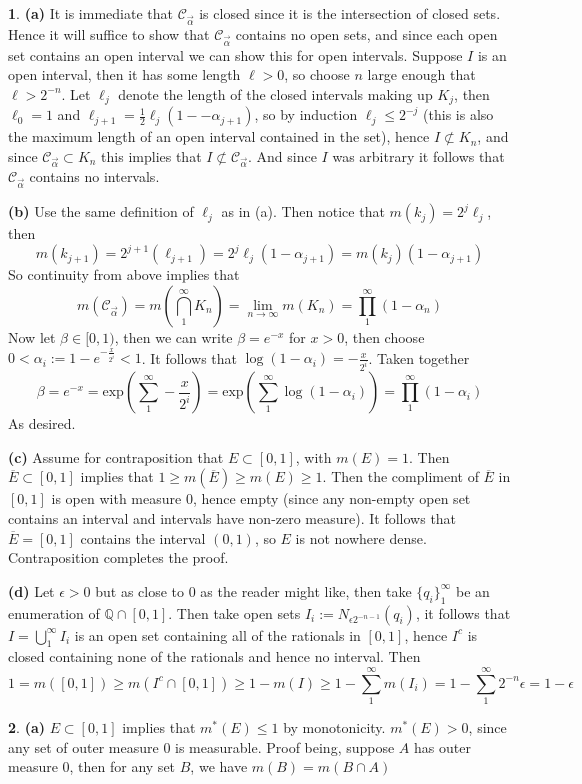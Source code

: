 \documentclass[10.5pt]{article}
\theoremstyle{definition}
\newtheorem{pb}{}
\newcommand{\set}[1]{\{#1\}}
\begin{document}
    \begin{pb}
        \textbf{(a)} It is immediate that \(\mathcal{C}_{\overrightarrow{\alpha}}\) is closed since it is the intersection of closed sets. Hence it will suffice to show that \(\mathcal{C}_{\overrightarrow{\alpha}}\)
        contains no open sets, and since each open set contains an open interval we can show this for open intervals. Suppose \(I\) is an open interval, then it has some length
        \(\ell > 0\), so choose \(n\) large enough that \(\ell > 2^{-n}\). Let \(\ell_j\) denote the length of the closed intervals making up \(K_j\), then \(\ell_{0} = 1\) and
        \(\ell_{j+1} = \frac12\ell_j(1- - \alpha_{j+1})\), so by induction \(\ell_j \leq 2^{-j}\) (this is also the maximum length of an open interval contained in the set),
        hence \(I \not \subset K_n\), and since \(\mathcal{C}_{\overrightarrow{\alpha}}\subset K_n\) this implies that
        \(I \not \subset \mathcal{C}_{\overrightarrow{\alpha}}\). And since \(I\) was arbitrary it follows that \(\mathcal{C}_{\overrightarrow{\alpha}}\) contains no intervals.

        \textbf{(b)} Use the same definition of \(\ell_j\) as in (a). Then notice that \(m(k_j) = 2^j \ell_j\), then
        \[m(k_{j+1}) = 2^{j+1}(\ell_{j+1}) = 2^j \ell_j(1-\alpha_{j+1}) = m(k_j)(1-\alpha_{j+1})\]
        So continuity from above implies that 
        \[m(\mathcal{C}_{\overrightarrow{\alpha}}) = m\left(\bigcap_1^\infty K_n\right) = \lim_{n\to\infty}m(K_n) = \prod_1^\infty(1-\alpha_n)\]
        Now let \(\beta \in [0,1)\), then we can write \(\beta = e^{-x}\) for \(x > 0\), then choose \(0<\alpha_i := 1 - e^{-\frac{x}{2^i}}<1\).
        It follows that \(\log(1-\alpha_i) = -\frac{x}{2^i}\). Taken together
        \[\beta = e^{-x} = \text{exp}(\sum_1^\infty -\frac{x}{2^i}) = \text{exp}(\sum_1^\infty \log(1-\alpha_i)) = \prod_1^\infty(1-\alpha_i)\]
        As desired.

        \textbf{(c)} Assume for contraposition that \(E \subset [0,1]\), with \(m(E) = 1\). Then \(\overline{E} \subset [0,1]\) implies that \(1 \geq m(\overline{E}) \geq m(E) \geq 1\).
        Then the compliment of \(\overline{E}\) in \([0,1]\) is open with measure \(0\), hence empty (since any non-empty open set contains an interval and intervals have non-zero measure).
        It follows that \(\overline{E} = [0,1]\) contains the interval \((0,1)\), so \(E\) is not nowhere dense. Contraposition completes the proof.

        \textbf{(d)} Let \(\epsilon > 0\) but as close to \(0\) as the reader might like, then take \(\set{q_i}_1^\infty\) be an enumeration of
        \(\mathbb{Q} \cap [0,1]\). Then take open sets \(I_i := N_{\epsilon 2^{-n-1}}(q_i)\), it follows that \(I = \bigcup_1^\infty I_i\) is an open set containing all
        of the rationals in \([0,1]\), hence \(I^c\) is closed containing none of the rationals and hence no interval. Then
        \[1 = m([0,1]) \geq m(I^c \cap [0,1]) \geq 1-m(I) \geq 1 - \sum_1^\infty m(I_i) = 1 - \sum_1^\infty 2^{-n}\epsilon = 1 - \epsilon\]
    \end{pb}
    \begin{pb}
        \textbf{(a)} \(E \subset [0,1]\) implies that \(m^*(E) \leq 1\) by monotonicity. \(m^*(E) > 0\), since any set of outer measure \(0\) is measurable.
        Proof being, suppose \(A\) has outer measure \(0\), then for any set \(B\), we have \(m(B) = m(B \cap A)\)
    \end{pb}
\end{document}
